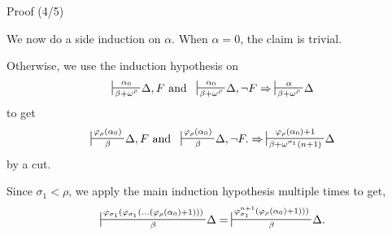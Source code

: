 \documentclass[10pt]{beamer}
\newcommand{\sintcons}[2]{\;\sststile{#2}{#1}\!}
\begin{document}
\begin{frame}{Proof (4/5)}

We now do a side induction on $\alpha$. When $\alpha = 0$, the claim is trivial. \pause



Otherwise, we use the induction hypothesis on
$$
\sintcons{\alpha_0}{\beta+\omega^\rho} \Delta, F
\text{ and }
\sintcons{\alpha_0}{\beta+\omega^\rho} \Delta, \neg F \Rightarrow
\sintcons{\alpha}{\beta+\omega^\rho}\Delta
$$
to get
$$
\sintcons{\varphi_\rho(\alpha_0)}{\beta} \Delta, F
\text{ and }
\sintcons{\varphi_\rho(\alpha_0)}{\beta} \Delta, \neg F.
\Rightarrow
\sintcons{\varphi_\rho(\alpha_0)+1}{\beta + \omega^{\sigma_1}(n+1)} \Delta
$$
by a cut.
\pause

Since $\sigma_1 < \rho$, we apply the main induction hypothesis multiple times to get,
$$
\sintcons{\varphi_{\sigma_1}(\varphi_{\sigma_1}(...(\varphi_{\rho}(\alpha_0)+1)))}{\beta} \Delta =
\sintcons{\varphi_{\sigma_1}^{n+1}(\varphi_{\rho}(\alpha_0)+1)))}{\beta} \Delta.
$$

\end{frame}
\end{document}
